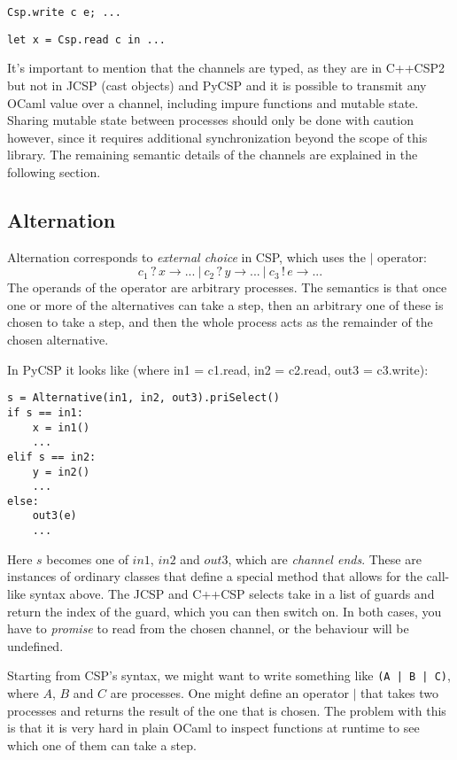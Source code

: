 \documentclass[a4paper,12pt]{article}
\begin{document}
\begin{verbatim}
Csp.write c e; ...
\end{verbatim}
\begin{verbatim}
let x = Csp.read c in ...
\end{verbatim}

It's important to mention that the channels are typed, as they are in C++CSP2
but not in JCSP (cast objects) and PyCSP and it is possible to transmit any
OCaml value over a channel, including impure functions and mutable state.
Sharing mutable state between processes should only be done with caution however,
since it requires additional synchronization beyond the scope of this library.
The remaining semantic details of the channels are explained in the following
section.


\subsection{Alternation}
Alternation corresponds to \emph{external choice} in CSP, which uses the $|$ operator:
\[c_1\,?\,x \to ...\ |\ c_2\,?\,y \to ...\ |\ c_3\,!\,e \to ...\]
The operands of the operator are arbitrary processes. The semantics is that once one or 
more of the alternatives can take a step, then an arbitrary one of these is chosen to take a 
step, and then the whole process acts as the remainder of the chosen alternative.

In PyCSP it looks like (where in1 = c1.read, in2 = c2.read, out3 = c3.write):
\begin{verbatim}
s = Alternative(in1, in2, out3).priSelect()
if s == in1:
    x = in1()
    ...
elif s == in2:
    y = in2()
    ...
else:
    out3(e)
    ...
\end{verbatim}
Here $s$ becomes one of $in1$, $in2$ and $out3$, which are \emph{channel ends}. These are instances
of ordinary classes that define a special method that allows for the call-like syntax above.
The JCSP and C++CSP selects take in a list of guards and return the index of the guard, which you can 
then switch on. In both cases, you have to \emph{promise} to read from the chosen channel, or the 
behaviour will be undefined.

Starting from CSP's syntax, we might want to write something like \texttt{(A | B | C)}, where $A$, $B$
and $C$ are processes. One might define an operator $|$ that takes two processes and returns the result 
of the one that is chosen. The problem with this is that it is very hard in plain OCaml to inspect 
functions at runtime to see which one of them can take a step.
\end{document}
